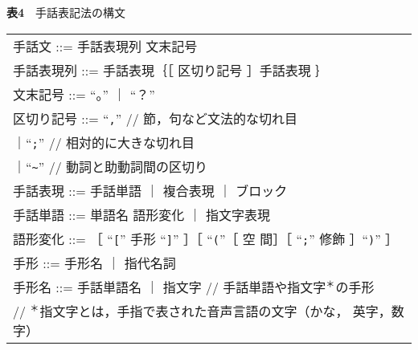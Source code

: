 \begin{center}
  
  
  {\bf 表4}　手話表記法の構文 \\ \vskip10pt
  \tablefirsthead{\hline}
  \tablelasttail{\hline}
  

\begin{supertabular}{|p{13.6cm}|}
    手話文 ::= 手話表現列 文末記号 \\ 
    手話表現列 ::= 手話表現｛［ 区切り記号 ］手話表現 ｝\\
    文末記号 ::= ``。\unskip'' ｜ ``？'' \\ 
    区切り記号 ::= ``{\tt ,}''	\hfill // 節，句など文法的な切れ目 \\
    \hspace{6zw}｜``{\tt ;}'' 	\hfill	// 相対的に大きな切れ目 \\
    \hspace{6zw}｜``{\tt \verb+~+}''  	\hfill	// 動詞と助動詞間の区切り \\
    手話表現 ::= 手話単語 ｜ 複合表現 ｜ ブロック \\ 
    手話単語 ::= 単語名 語形変化 ｜ 指文字表現 \\
    語形変化 ::= ［ ``{\tt [}'' 手形 ``{\tt ]}'' ］［ ``{\tt (}''［ 空
    間］［ ``{\tt ;}'' 修飾 ］``{\tt )}'' ］ \\

    手形 ::= 手形名 ｜ 指代名詞 \\
    手形名 ::= 手話単語名 ｜ 指文字 \hfill // 手話単語や指文字${}^{＊}$の手形 \\
    \hfill // ${}^{＊}$指文字とは，手指で表された音声言語の文字（かな，
    英字，数字）\\


\end{supertabular}
\end{center}
